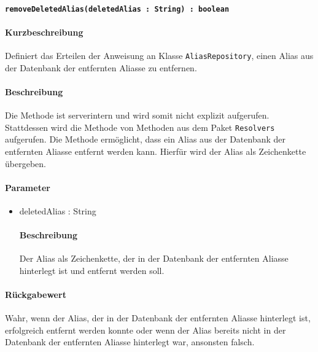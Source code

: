 \paragraph*{\texttt{removeDeletedAlias(deletedAlias : String) : boolean}}%
\paragraph*{Kurzbeschreibung}
Definiert das Erteilen der Anweisung an Klasse \texttt{AliasRepository}, einen Alias aus der Datenbank der entfernten Aliasse zu entfernen.
\paragraph*{Beschreibung}
Die Methode ist serverintern und wird somit nicht explizit aufgerufen.
Stattdessen wird die Methode von Methoden aus dem Paket \texttt{Resolvers} aufgerufen.
Die Methode ermöglicht, dass ein Alias aus der Datenbank der entfernten Aliasse entfernt werden kann.
Hierfür wird der Alias als Zeichenkette übergeben.
\paragraph*{Parameter}
\begin{itemize}
    \item deletedAlias : String
    		\paragraph*{Beschreibung}
    		Der Alias als Zeichenkette, der in der Datenbank der entfernten Aliasse hinterlegt ist und entfernt werden soll.
\end{itemize}
\paragraph*{Rückgabewert}
Wahr, wenn der Alias, der in der Datenbank der entfernten Aliasse hinterlegt ist, erfolgreich entfernt werden konnte oder wenn der Alias bereits nicht in der Datenbank der entfernten Aliasse hinterlegt war, ansonsten falsch.

